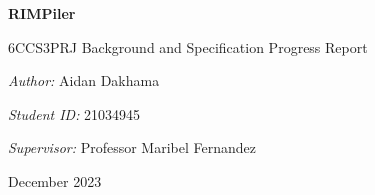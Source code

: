 \begin{titlepage}
    \begin{center}
        \vspace*{1cm}

        \huge \textbf{RIMPiler}

        \vspace{0.5cm}
        \large 6CCS3PRJ Background and Specification Progress Report

        \vspace{8cm}

        \normalfont \normalsize
        \begin{minipage}{0.8\textwidth}
            \begin{center}
                \large \emph{Author:}
                Aidan Dakhama
            \end{center}
        \end{minipage}

        \vspace{0.5cm}

        \begin{minipage}{0.8\textwidth}
            \begin{center}
                \large \emph{Student ID:}
                21034945
            \end{center}
        \end{minipage}

        \vspace{0.5cm}

        \begin{minipage}{0.8\textwidth}
            \begin{center}
                \large \emph{Supervisor:}
                Professor Maribel Fernandez
            \end{center}
        \end{minipage}

        \vfill

        \begin{minipage}{0.8\textwidth}
            \begin{center}
                December 2023
            \end{center}
        \end{minipage}

    \end{center}
\end{titlepage}